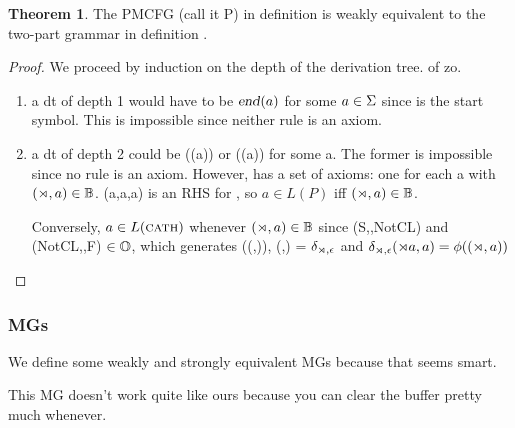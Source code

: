 \documentclass[12pt]{article}
\theoremstyle{definition}
\newtheorem{thm}{Theorem}[section]
\begin{document}
 \begin{thm}
   The PMCFG (call it P) in definition \label{def:pmcfg} is weakly equivalent to the two-part grammar in definition \label{def:g}.
 \end{thm}

 \begin{proof}
   We proceed by induction on the depth of the derivation tree. of zo.

   \begin{enumerate}
   \item a dt of depth 1 would have to be $\text{\textsl{end}}(a)$ for some $a\in\Sigma$ since \ed is the start symbol. This is impossible since neither \ed rule is an axiom.
   \item a dt of depth 2 could be \ed(\cp(a)) or \ed(\mg(a)) for some a. The former is impossible since no \cp rule is an axiom. However, \mg has a set of axioms: one for each a with $(\rtimes,a)\in\mathbb{B}$. \mg(a,a,a) is an RHS for \ed, so $a\in L(P)$ iff $(\rtimes,a)\in\mathbb{B}$.

     Conversely, $a\in L(\text{\textsc{cath}})$ whenever $(\rtimes,a)\in\mathbb{B}$ since (S,\mg,NotCL) and (NotCL,\ed,F) $\in \mathbb{O}$, which generates \ed(\mg(\LBOUND,\emp)), \mg(\LBOUND,\emp) = $\delta_{\rtimes,\epsilon}$ and  $\delta_{\rtimes,\epsilon}(\rtimes a,a) = \phi((\rtimes,a))$

     
   \end{enumerate}

   
 \end{proof}

 
\subsubsection{MGs}
\label{sec:mgs}



We define some weakly and strongly equivalent MGs because that seems smart.

This MG doesn't work quite like ours because you can clear the buffer pretty much whenever.
\end{document}
